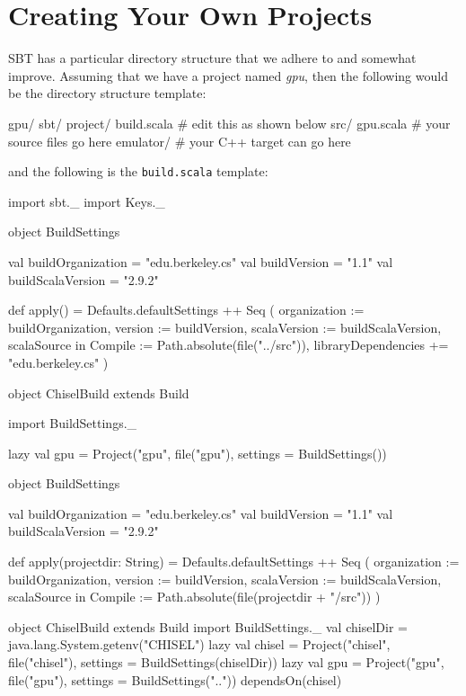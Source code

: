 \documentclass[twocolumn, 10pt]{article}
\begin{document}
\section{Creating Your Own Projects}

SBT has a particular directory structure that we adhere to and
somewhat improve.  Assuming that we have a project named {\em gpu},
then the following would be the directory structure template:

\begin{bash}
gpu/
  sbt/
    project/
      build.scala # edit this as shown below
  src/ 
    gpu.scala     # your source files go here
  emulator/       # your C++ target can go here
\end{bash}

\noindent
and the following is the \verb+build.scala+ template:

\begin{scala}
import sbt._
import Keys._

object BuildSettings
{
  val buildOrganization = "edu.berkeley.cs"
  val buildVersion = "1.1"
  val buildScalaVersion = "2.9.2"

  def apply() = {
    Defaults.defaultSettings ++ Seq (
      organization := buildOrganization,
      version      := buildVersion,
      scalaVersion := buildScalaVersion,
      scalaSource in Compile := Path.absolute(file("../src")),
      libraryDependencies += "edu.berkeley.cs" %
    )
  }
}

object ChiselBuild extends Build
{
  import BuildSettings._

  lazy val gpu = Project("gpu", file("gpu"), settings = BuildSettings()) 
}

object BuildSettings {
  val buildOrganization = "edu.berkeley.cs"
  val buildVersion = "1.1"
  val buildScalaVersion = "2.9.2"

  def apply(projectdir: String) = {
    Defaults.defaultSettings ++ Seq (
      organization := buildOrganization,
      version      := buildVersion,
      scalaVersion := buildScalaVersion,
      scalaSource in Compile := 
        Path.absolute(file(projectdir + "/src"))
    )
  }
}

object ChiselBuild extends Build {
  import BuildSettings._
  val chiselDir = java.lang.System.getenv("CHISEL")
  lazy val chisel = 
    Project("chisel", file("chisel"), 
            settings = BuildSettings(chiselDir))
  lazy val gpu =
    Project("gpu", file("gpu"), 
            settings = BuildSettings("..")) 
      dependsOn(chisel)
}
\end{scala}
\end{document}
